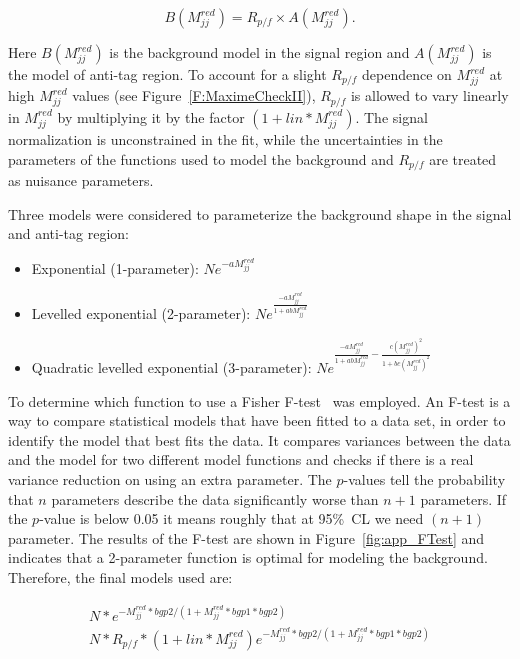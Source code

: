 \begin{equation}
B(M_{jj}^{red})= R_{p/f}\times A(M_{jj}^{red}).
\end{equation}

\noindent
Here $B(M_{jj}^{red})$ is the background model in the signal region and $A(M_{jj}^{red})$ is the model of anti-tag region. To account for a slight $R_{p/f}$ dependence on $M_{jj}^{red}$ at high $M_{jj}^{red}$  values (see Figure~\ref{F:MaximeCheckII}), $R_{p/f}$ is allowed to vary linearly in $M_{jj}^{red}$ by multiplying it by the factor $(1+lin\ast M_{jj}^{red})$. The signal normalization is unconstrained in the fit, while the uncertainties in the parameters of the functions used to model the background and $R_{p/f}$ are treated as nuisance parameters. 

Three models were considered to parameterize the background shape in the signal and anti-tag region: 

\begin{itemize}
\item
Exponential (1-parameter): $N e^{-a M_{jj}^{red}}$

\item
Levelled exponential (2-parameter): $N e^{\frac{-a M_{jj}^{red}}{1+abM_{jj}^{red}}}$

\item
Quadratic levelled exponential (3-parameter): $N e^{\frac{-aM_{jj}^{red}}{1+abM_{jj}^{red}}-\frac{c(M_{jj}^{red})^2}{1+bc(M_{jj}^{red})^2}}$
\end{itemize}

\noindent
To determine which function to use a Fisher F-test~\cite{FTest} was employed. An F-test is a way to compare statistical models that have been fitted to a data set, in order to identify the model that best fits the data. It compares variances between the data and the model for two different model functions and checks if there is a real variance reduction on using an extra parameter. The $p$-values tell the probability that $n$ parameters describe the data significantly worse than $n+1$ parameters. If the $p$-value is below 0.05 it means roughly that at 95\%~CL we need $(n+1)$ parameter. The results of the F-test are shown in Figure~\ref{fig:app_FTest} and indicates that a 2-parameter function is optimal for modeling the background. Therefore, the final models used are:

\begin{gather}
N\ast e^{-M_{jj}^{red}\ast bgp2/(1+M_{jj}^{red}\ast bgp1\ast bgp2)}\label{eq:SignalRg}\\
N\ast R_{p/f}\ast(1+lin\ast M_{jj}^{red}) e^{-M_{jj}^{red}\ast bgp2/(1+M_{jj}^{red}\ast bgp1\ast bgp2)} \label{eq:BackgroundRg}
\end{gather}

